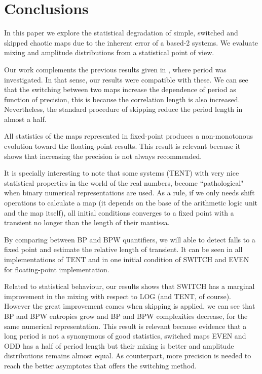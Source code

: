 \section{Conclusions}\label{sec:conclusions}
In this paper we explore the statistical degradation of simple, switched and skipped chaotic maps due to the inherent error of a based-2 systems.
We evaluate mixing and amplitude distributions from a statistical point of view.

Our work complements the previous results given in \cite{Nagaraj2008}, where period was investigated.
In that sense, our results were compatible with these.
We can see that the switching between two maps increase the dependence of period as function of precision, this is because the correlation length is also increased.
Nevertheless, the standard procedure of skipping reduce the period length in almost a half.

All statistics of the maps represented in fixed-point produces a non-monotonous evolution toward the floating-point results.
This result is relevant because it shows that increasing the precision is not always recommended.

It is specially interesting to note that some systems (TENT) with very nice statistical properties in the world of the real numbers, become ``pathological" when binary numerical representations are used.
As a rule, if we only needs shift operations to calculate a map (it depends on the base of the arithmetic logic unit and the map itself), all initial conditions converges to a fixed point with a transient no longer than the length of their mantissa.

By comparing between BP and BPW quantifiers, we will able to detect falls to a fixed point and estimate the relative length of transient. It can be seen in all implementations of TENT and in one initial condition of SWITCH and EVEN for floating-point implementation.

Related to statistical behaviour, our results shows that SWITCH has a marginal improvement in the mixing with respect to LOG (and TENT, of course).
However the great improvement comes when skipping is applied, we can see that BP and BPW entropies grow and BP and BPW complexities decrease, for the same numerical representation.
This result is relevant because evidence that a long period is not a synonymous of good statistics, switched maps EVEN and ODD has a half of period length but their mixing is better and amplitude distributions remains almost equal.
As counterpart, more precision is needed to reach the better asymptotes that offers the switching method.
